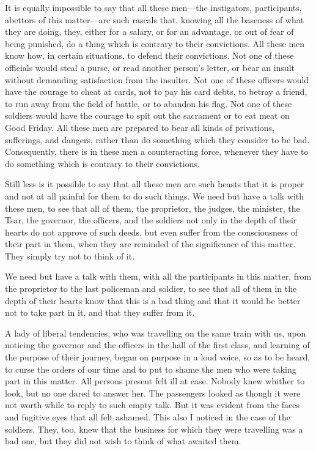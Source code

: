 \documentclass{book}
\begin{document}
It is equally impossible to say that all these men—the instigators, participants, abettors of this matter—are such rascals that, knowing all the baseness of what they are doing, they, either for a salary, or for an advantage, or out of fear of being punished, do a thing which is contrary to their convictions. All these men know how, in certain situations, to defend their convictions. Not one of these officials would steal a purse, or read another person’s letter, or bear an insult without demanding satisfaction from the insulter. Not one of these officers would have the courage to cheat at cards, not to pay his card debts, to betray a friend, to run away from the field of battle, or to abandon his flag. Not one of these soldiers would have the courage to spit out the sacrament or to eat meat on Good Friday. All these men are prepared to bear all kinds of privations, sufferings, and dangers, rather than do something which they consider to be bad. Consequently, there is in these men a counteracting force, whenever they have to do something which is contrary to their convictions.

Still less is it possible to say that all these men are such beasts that it is proper and not at all painful for them to do such things. We need but have a talk with these men, to see that all of them, the proprietor, the judges, the minister, the Tsar, the governor, the officers, and the soldiers not only in the depth of their hearts do not approve of such deeds, but even suffer from the consciousness of their part in them, when they are reminded of the significance of this matter. They simply try not to think of it.

We need but have a talk with them, with all the participants in this matter, from the proprietor to the last policeman and soldier, to see that all of them in the depth of their hearts know that this is a bad thing and that it would be better not to take part in it, and that they suffer from it.

A lady of liberal tendencies, who was travelling on the same train with us, upon noticing the governor and the officers in the hall of the first class, and learning of the purpose of their journey, began on purpose in a loud voice, so as to be heard, to curse the orders of our time and to put to shame the men who were taking part in this matter. All persons present felt ill at ease. Nobody knew whither to look, but no one dared to answer her. The passengers looked as though it were not worth while to reply to such empty talk. But it was evident from the faces and fugitive eyes that all felt ashamed. This also I noticed in the case of the soldiers. They, too, knew that the business for which they were travelling was a bad one, but they did not wish to think of what awaited them.
\end{document}
